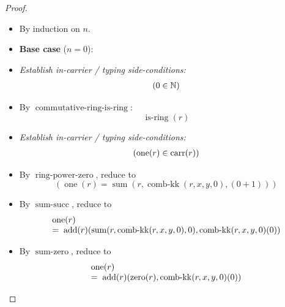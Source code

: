 \documentclass[11pt]{article}
\theoremstyle{plain}
\begin{document}
\begin{proof}
\begin{itemize}[leftmargin=2.8em, itemsep=4pt, parsep=1pt]
  \item[\textbf{1}] By induction on $n$.
  \item[]\textbf{Base case} ($n = 0$):
  \item[\textbf{2--5}] \emph{Establish in-carrier / typing side-conditions:}
\begin{equation*}
\begin{array}{@{}l@{}}
(0 \in \mathbb{N})
\end{array}
\end{equation*}

  \item[\textbf{6}] By $\operatorname{commutative\text{-}ring\text{-}is\text{-}ring}$:
\begin{equation*}
\operatorname{is\text{-}ring}(r)
\end{equation*}

  \item[\textbf{7}] \emph{Establish in-carrier / typing side-conditions:}
\begin{equation*}
\begin{array}{@{}l@{}}
(\operatorname{one}(r) \in \operatorname{carr}(r))
\end{array}
\end{equation*}

  \item[\textbf{8}] By $\operatorname{ring\text{-}power\text{-}zero}$, reduce to
\begin{equation*}
(\operatorname{one}(r) = \operatorname{sum}(r, \operatorname{comb\text{-}kk}(r, x, y, 0), (0 + 1)))
\end{equation*}

  \item[\textbf{9}] By $\operatorname{sum\text{-}succ}$, reduce to
\begin{equation*}
\begin{array}{@{}l@{}} \operatorname{one}(r) \\ =\; \operatorname{add}(r)(\operatorname{sum}(r, \operatorname{comb\text{-}kk}(r, x, y, 0), 0), \operatorname{comb\text{-}kk}(r, x, y, 0)(0)) \end{array}
\end{equation*}

  \item[\textbf{10}] By $\operatorname{sum\text{-}zero}$, reduce to
\begin{equation*}
\begin{array}{@{}l@{}} \operatorname{one}(r) \\ =\; \operatorname{add}(r)(\operatorname{zero}(r), \operatorname{comb\text{-}kk}(r, x, y, 0)(0)) \end{array}
\end{equation*}


\end{itemize}
\end{proof}
\end{document}
